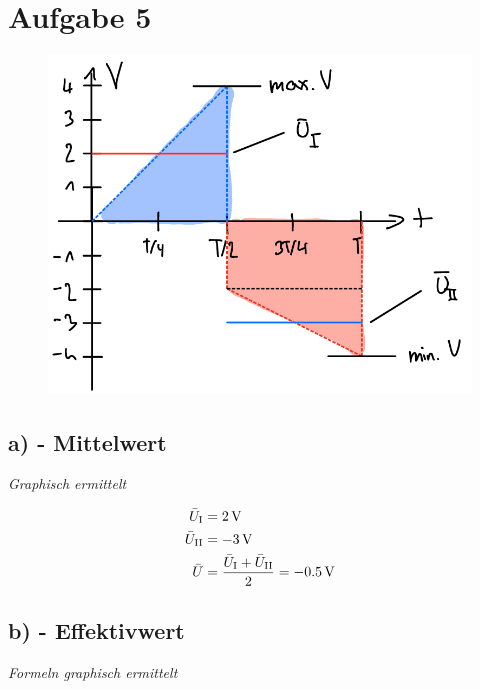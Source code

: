 \documentclass[../../document.tex]{subfiles}
\begin{document}
\section*{Aufgabe 5}

\begin{figure}[H]
    \begin{center}
        \includegraphics[width=.9\linewidth]{../../img/aufg5}
    \end{center}
\end{figure}

\subsection*{a) - Mittelwert}

\emph{Graphisch ermittelt}

\begin{equation*}
    \begin{split}
        \bar{U}_{\textrm{I}} &= \SI{2}{\volt}\\
        \bar{U}_{\textrm{II}} &= \SI{-3}{\volt}\\
        \bar{U} &= \frac{\bar{U}_{\textrm{I}} + \bar{U}_{\textrm{II}}}{2} = \SI{-0,5}{\volt}
    \end{split}
\end{equation*}

\newpage

\subsection*{b) - Effektivwert}

\emph{Formeln graphisch ermittelt}
\end{document}
